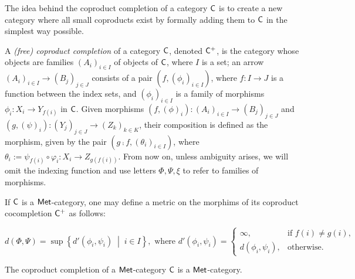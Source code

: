 The idea behind the coproduct completion of a category $\mathsf{C}$ is to create a new category where all small coproducts exist by formally adding them to $\mathsf{C}$  in the simplest way possible.

\begin{definition}
  A \emph{(free) coproduct completion} of a category \(\mathsf{C}\), denoted $\mathsf{C}^+$, is the category whose objects are families \((A_i)_{i \in I}\) of objects of \(\mathsf{C}\), where \(I\) is a set; an arrow \((A_i)_{i \in I} \to (B_j)_{j \in J}\) consists of a pair \((f, (\phi_i)_{i \in I})\), where \(f : I \to J\) is a function between the index sets, and \((\phi_i)_{i \in I}\) is a family of morphisms \(\phi_i : X_i \to Y_{f(i)}\) in \(\mathsf{C}\). Given morphisms $(f,(\phi)_i): (A_i)_{i \in I} \to (B_j)_{j \in J}$ and $(g,(\psi)_i): (Y_j)_{j \in J} \to (Z_k)_{k \in K}$, their composition is defined as the morphism, given by the pair \((g \comp f, (\theta_i)_{i \in I})\), where $ \theta_i := \psi_{f(i)} \circ \varphi_i : X_i \to Z_{g(f(i))}$. From now on, unless ambiguity arises, we will omit the indexing function and use letters $\Phi, \Psi, \xi$ to refer to families of morphisms.
\end{definition}



If $\mathsf{C}$ is a $\mathsf{Met}$-category, one may define a metric on the morphims of its coproduct cocompletion $\mathsf{C}^+$ as follows:

\begin{equation*}
  d(\Phi, \Psi) = \sup \left\{ d'(\phi_i, \psi_i) \;\middle\vert\; i \in I \right\},\text{ where } 
  d'(\phi_i, \psi_i) 
  = 
  \begin{cases}
    \infty, & \text{if } f(i) \neq g(i), \\
    d(\phi_i, \psi_i), & \text{otherwise}.
  \end{cases}
\end{equation*}

\begin{proposition} \label{prop:cop_completion_met}
  The coproduct completion of a $\mathsf{Met}$-category $\mathsf{C}$ is a $\mathsf{Met}$-category.
\end{proposition}

